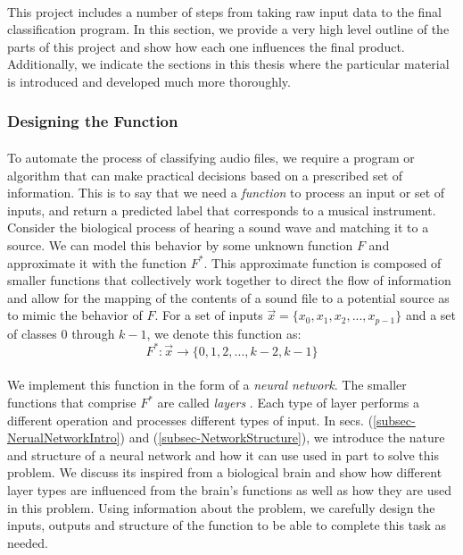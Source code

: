 \documentclass[12pt,letterpaper]{article}
\begin{document}
\paragraph*{}This project includes a number of steps from taking raw input data to the final classification program. In this section, we provide a very high level outline of the parts of this project and show how each one influences the final product. Additionally, we indicate the sections in this thesis where the particular material is introduced and developed much more thoroughly.


\subsubsection{Designing the Function}

\paragraph*{}To automate the process of classifying audio files, we require a program or algorithm that can make practical decisions based on a prescribed set of information. This is to say that we need a \textit{function} to process an input or set of inputs, and return a predicted label that corresponds to a musical instrument. Consider the biological process of hearing a sound wave and matching it to a source. We can model this behavior by some unknown function $F$ and approximate it with the function $F^*$. This approximate function is composed of smaller functions that collectively work together to direct the flow of information and allow for the mapping of the contents of a sound file to a potential source as to mimic the behavior of $F$. For a set of inputs $\vec{x} = \big\{ x_0 , x_1 , x_2 , ... , x_{p-1} \big\}$ and a set of classes $0$ through $k-1$, we denote this function as:
\begin{equation}
\label{eqn-MappingFunction}
F^*: \vec{x} \rightarrow \big\{ 0, 1, 2, ... ,k-2, k-1 \big\}
\end{equation}

\paragraph*{}We implement this function in the form of a \textit{neural network}. The smaller functions that comprise $F^*$ are called \textit{layers} \cite{Loy,Goodfellow}. Each type of layer performs a different operation and processes different types of input. In secs. (\ref{subsec-NerualNetworkIntro}) and (\ref{subsec-NetworkStructure}), we introduce the nature and structure of a neural network and how it can use used in part to solve this problem. We discuss its inspired from a biological brain and show how different layer types are influenced from the brain's functions as well as how they are used in this problem. Using information about the problem, we carefully design the inputs, outputs and structure of the function to be able to complete this task as needed. 
\end{document}
